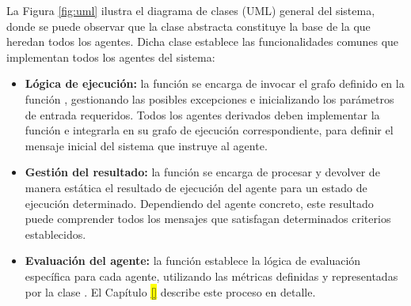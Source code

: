 La Figura \ref{fig:uml} ilustra el diagrama de clases (UML) general del sistema, donde se puede observar que la clase abstracta  constituye la base de la que heredan todos los agentes. Dicha clase establece las funcionalidades comunes que implementan todos los agentes del sistema:

\begin{itemize}
\item \textbf{Lógica de ejecución:} la función  se encarga de invocar el grafo definido en la función , gestionando las posibles excepciones e inicializando los parámetros de entrada requeridos. Todos los agentes derivados deben implementar la función  e integrarla en su grafo de ejecución correspondiente, para definir el mensaje inicial del sistema que instruye al agente.
\item \textbf{Gestión del resultado:} la función  se encarga de procesar y devolver de manera estática el resultado de ejecución del agente para un estado de ejecución determinado. Dependiendo del agente concreto, este resultado puede comprender todos los mensajes que satisfagan determinados criterios establecidos.
\item \textbf{Evaluación del agente:} la función  establece la lógica de evaluación específica para cada agente, utilizando las métricas definidas y representadas por la clase . El Capítulo \colorbox{yellow}{\ref{}} describe este proceso en detalle.
\end{itemize}

